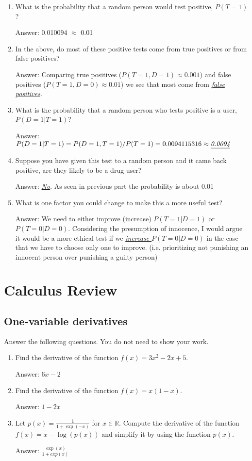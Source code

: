 \documentclass{article}
\def\ans#1{\par\gre{Answer: #1}}
\def\blu#1{{\color{blu}#1}}
\def\gre#1{{\color{gre}#1}}
\def\R{\mathbb{R}}
\begin{document}
\begin{enumerate}
\item What is the probability that a random person would test positive, $P(T=1)$?
\ans{0.010094 $\approx$ 0.01}
\item In the above, do most of these positive tests come from true positives or from false positives?
\ans{Comparing true positives ($P(T=1,D=1)\approx0.001$) and false positives ($P(T=1, D=0)\approx0.01$) we see that most come from \emph{\underline{false positives}}.}
\item What is the probability that a random person who tests positive is a user, $P(D=1|T=1)$?
\ans{$P(D=1|T=1) = P(D=1,T=1)/P(T=1) = 0.0094115316 \approx \emph{\underline{0.0094}}$}
\item Suppose you have given this test to a random person and it came back positive, are they likely to be a drug user?
\ans{\emph{\underline{No}}. As seen in previous part the probability is about 0.01}
\item What is one factor you could change to make this a more useful test?
\ans{We need to either improve (increase) $P(T=1|D=1)$ or $P(T=0|D=0)$. Considering the presumption of innocence, I would argue it would be a more ethical test if we \emph{\underline{increase $P(T=0|D=0)$}} in the case that we have to choose only one to improve. (i.e. prioritizing not punishing an innocent person over punishing a guilty person)}
\end{enumerate}


\section{Calculus Review}


\subsection{One-variable derivatives}

\blu{Answer the following questions.} You do not need to show your work.

\begin{enumerate}
\item Find the derivative of the function $f(x) = 3x^2 -2x + 5$.
\ans{$6x - 2$}
\item Find the derivative of the function $f(x) = x(1-x)$.
\ans{$1 - 2x$}
\item Let $p(x) = \frac{1}{1+\exp(-x)}$ for $x \in \R$. Compute the derivative of the function $f(x) = x-\log(p(x))$ and simplify it by using the function $p(x)$.
\ans{$\frac{\exp(x)}{1+exp(x)}$}
\end{enumerate}
\end{document}
